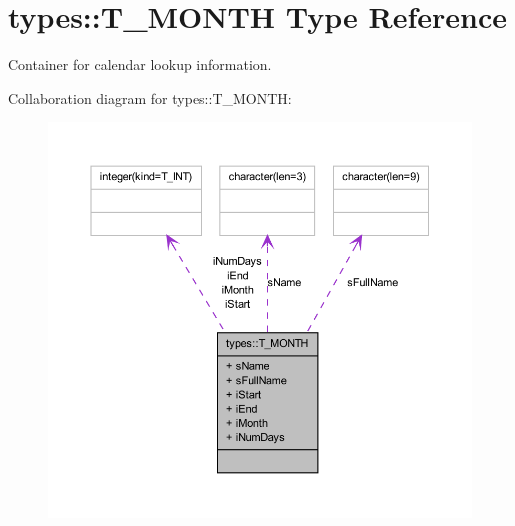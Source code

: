 \hypertarget{typetypes_1_1_t___m_o_n_t_h}{
\section{types::T\_\-MONTH Type Reference}
\label{typetypes_1_1_t___m_o_n_t_h}
}


Container for calendar lookup information.  




Collaboration diagram for types::T\_\-MONTH:\nopagebreak
\begin{figure}[H]
\begin{center}
\leavevmode
\includegraphics[width=388pt]{typetypes_1_1_t___m_o_n_t_h__coll__graph}
\end{center}
\end{figure}
